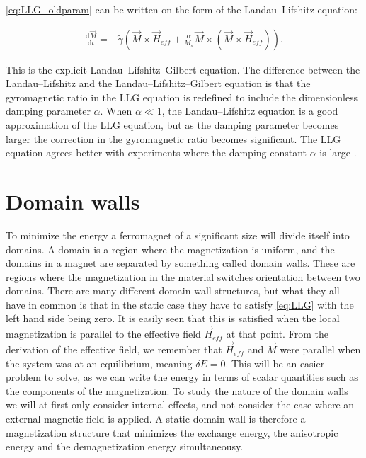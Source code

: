 \documentclass[1p]{elsarticle}		%
\numberwithin{equation}{section}
\begin{document}
\eqref{eq:LLG_oldparam} can be written on the form of the Landau--Lifshitz equation:

\begin{align}
\label{eq:LLG}
\frac{\textrm{d} \vec{M}}{\textrm{d} t} = -\tilde{\gamma} (\vec{M} \times \vec{H}_{eff} + \frac{\alpha}{M_s} \vec{M}\times(\vec{M}\times\vec{H}_{eff})).
\end{align}

This is the explicit Landau--Lifshitz--Gilbert equation. The difference between the Landau--Lifshitz and the Landau--Lifshitz--Gilbert equation is that the gyromagnetic ratio in the LLG equation is redefined to include the dimensionless damping parameter $\alpha$. When $\alpha \ll 1$, the Landau--Lifshitz equation is a good approximation of the LLG equation, but as the damping parameter becomes larger the correction in the gyromagnetic ratio becomes significant. The LLG equation agrees better with experiments where the damping constant $\alpha$ is large \cite{GilbertKelly1955}.

\section{Domain walls}
To minimize the energy a ferromagnet of a significant size will divide itself into domains. A domain is a region where the magnetization is uniform, and the domains in a magnet are separated by something called domain walls. These are regions where the magnetization in the material switches orientation between two domains. There are many different domain wall structures, but what they all have in common is that in the static case they have to satisfy \eqref{eq:LLG} with the left hand side being zero. It is easily seen that this is satisfied when the local magnetization is parallel to the effective field $\vec{H}_{eff}$ at that point. From the derivation of the effective field, we remember that $\vec{H}_{eff}$ and $\vec{M}$ were parallel when the system was at an equilibrium, meaning $\delta E = 0$. This will be an easier problem to solve, as we can write the energy in terms of scalar quantities such as the components of the magnetization. To study the nature of the domain walls we will at first only consider internal effects, and not consider the case where an external magnetic field is applied. A static domain wall is therefore a magnetization structure that minimizes the exchange energy, the anisotropic energy and the demagnetization energy simultaneousy.
\end{document}
